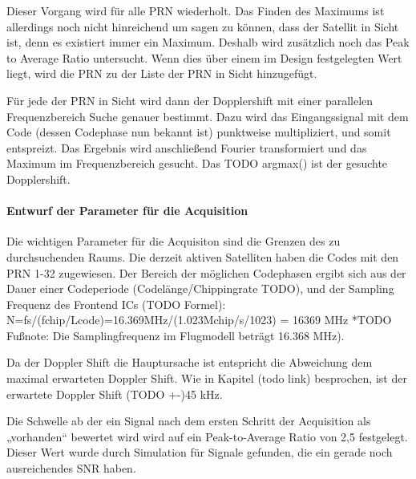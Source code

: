Dieser Vorgang wird für alle PRN wiederholt. Das Finden des Maximums ist allerdings noch nicht hinreichend um sagen zu können, dass der Satellit in Sicht ist, denn es existiert immer ein Maximum. Deshalb wird zusätzlich noch das Peak to Average Ratio untersucht. Wenn dies über einem im Design festgelegten Wert liegt, wird die PRN zu der Liste der PRN in Sicht hinzugefügt.

Für jede der PRN in Sicht wird dann der Dopplershift mit einer parallelen Frequenzbereich Suche genauer bestimmt. Dazu wird das Eingangssignal mit dem Code (dessen Codephase nun bekannt ist) punktweise multipliziert, und somit entspreizt. Das Ergebnis wird anschließend Fourier transformiert und das Maximum im Frequenzbereich gesucht. Das TODO argmax() ist der gesuchte Dopplershift.

\paragraph{Entwurf der Parameter für die Acquisition}
Die wichtigen Parameter für die Acquisiton sind die Grenzen des zu durchsuchenden Raums.
Die derzeit aktiven Satelliten haben die Codes mit den PRN 1-32 zugewiesen. Der Bereich der möglichen Codephasen ergibt sich aus der Dauer einer Codeperiode (Codelänge/Chippingrate TODO), und der Sampling Frequenz des Frontend ICs (TODO Formel): N=fs/(fchip/Lcode)=16.369MHz/(1.023Mchip/s/1023) = 16369 MHz *TODO Fußnote: Die Samplingfrequenz im Flugmodell beträgt 16.368 MHz).

Da der Doppler Shift die Hauptursache ist entspricht die Abweichung dem maximal erwarteten Doppler Shift. Wie in Kapitel (todo link) besprochen, ist der erwartete Doppler Shift (TODO +-)45 kHz.

Die Schwelle ab der ein Signal nach dem ersten Schritt der Acquisition als „vorhanden“ bewertet wird wird auf ein Peak-to-Average Ratio von 2,5 festgelegt. Dieser Wert wurde durch Simulation für Signale gefunden, die ein gerade noch ausreichendes SNR haben.

